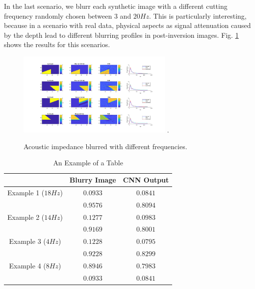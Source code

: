 \documentclass[conference,compsoc]{IEEEtran}
\begin{document}
In the last scenario, we blurr each synthetic image with a different
cutting frequency randomly chosen between $3$ and $20 Hz$. This is particularly interesting, because
in a scenario with real data, physical aspects as signal attenuation caused by the depth lead to
different blurring profiles in post-inversion images.
Fig. \ref{fig_scenario5} shows the results for this scenarios.
\begin{figure}[!t]
\centering
\includegraphics[width=3.0in]{Figs/Caso5}
\DeclareGraphicsExtensions.
\caption{Acoustic impedance blurred with different frequencies.}
\label{fig_scenario5}
\end{figure}

\begin{table}[!t]
\renewcommand{\arraystretch}{1.3}
\caption{An Example of a Table}
\label{table_caso_5}
\centering
\begin{tabular}{|c||c||c|}
\hline
 & Blurry Image & CNN Output \\
\hline
Example 1 ($18Hz$) & $0.0933$ & $0.0841$\\
\hline
	  & $0.9576$ & $0.8094$\\
\hline
Example 2 ($14Hz$)& $0.1277$ & $0.0983$ \\
\hline
	  & $0.9169$ & $0.8001$\\
\hline
Example 3 ($4Hz$)& $0.1228$ & $0.0795$\\
\hline
	  & $0.9228$ & $0.8299$\\
\hline
Example 4 ($8Hz$)& $0.8946$ & $0.7983$\\
\hline
  & $0.0933$ & $0.0841$\\
\hline
\end{tabular}
\end{table}
\end{document}
